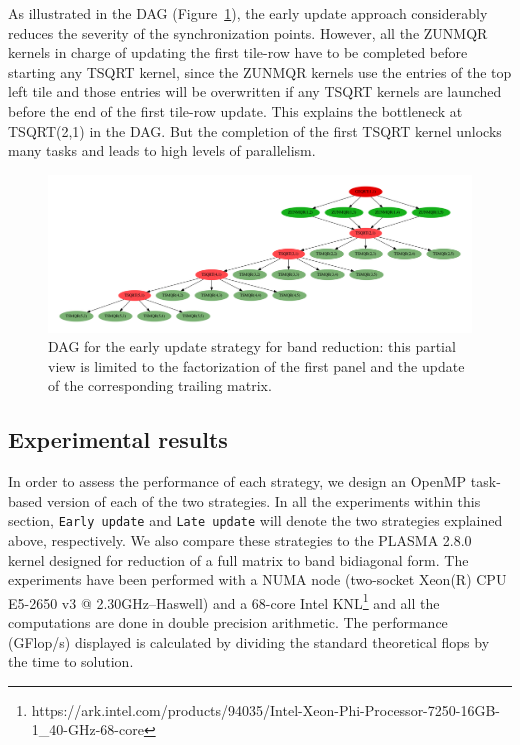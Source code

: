 As illustrated in the DAG (Figure~\ref{fig:dag_tile}),
the early update approach considerably reduces the severity of the
synchronization points.
However,
all the ZUNMQR kernels in charge of updating the
first tile-row have to be completed before starting
any TSQRT kernel,
since the ZUNMQR kernels use the entries of the top left tile and
those entries will be overwritten if any TSQRT kernels are
launched before the end of the first tile-row update.
This explains the bottleneck at TSQRT(2,1) in the DAG.
But the completion of the first TSQRT kernel unlocks many tasks
and leads to high levels of parallelism.


\begin{figure}[h!]
  \begin{center}
    \includegraphics[width=1\textwidth]{fig/dag_tile}
  \end{center}
  \caption{DAG for the early update strategy for band reduction:
    this partial view is limited to the factorization of the first panel and
    the update of the corresponding trailing matrix.}
  \label{fig:dag_tile}
\end{figure}

\subsection{Experimental results}
In order to assess the performance of each strategy,
we design an OpenMP task-based version of each of the two strategies.
In all the experiments within this section,
\texttt{Early update} and \texttt{Late update} will denote
the two strategies explained above, respectively.
We also compare these strategies to the PLASMA 2.8.0 kernel
designed for reduction of a full matrix to band bidiagonal form.
The experiments have been performed with a
NUMA node (two-socket Xeon(R) CPU E5-2650 v3 @ 2.30GHz--Haswell)
and a 68-core
Intel KNL\footnote{https://ark.intel.com/products/94035/Intel-Xeon-Phi-Processor-7250-16GB-1\_40-GHz-68-core}
and all the computations are done in double precision arithmetic.
The performance (GFlop/s) displayed is calculated by dividing the
standard theoretical flops by the time to solution.

